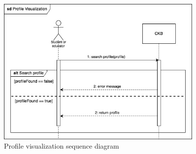 \begin{figure}[H]
    \centering
    \includegraphics[width=0.9\textwidth]{images/seq_diagrams/profile_visualization.jpg}
    \caption{Profile visualization sequence diagram}
\end{figure}
\clearpage

